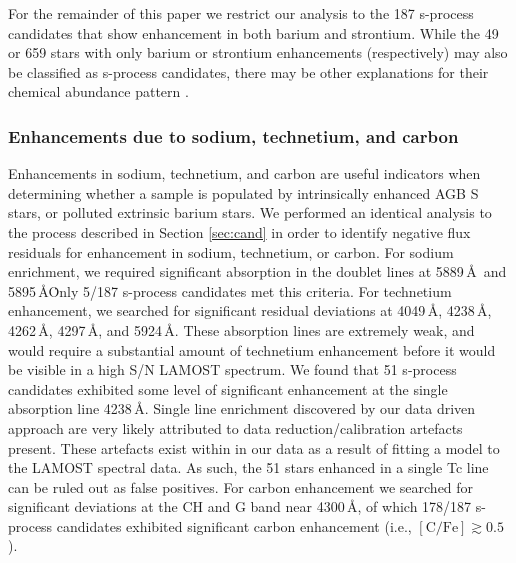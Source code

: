 \documentclass[a4paper,fleqn,usenatbib]{mnras}
\begin{document}
For the remainder of this paper we restrict our analysis to the 187 s-process candidates that show enhancement in both barium and strontium. While the 49 or 659 stars with only barium or strontium enhancements (respectively) may also be classified as s-process candidates, there may be other explanations for their chemical abundance pattern \citep[e.g.,][]{maiorca2011}. 


\subsubsection{Enhancements due to sodium, technetium, and carbon} \label{sec:other enhancements}
Enhancements in sodium, technetium, and carbon are useful indicators when determining whether a sample is populated by intrinsically enhanced AGB S stars, or polluted extrinsic barium stars. We performed an identical analysis to the process described in Section \ref{sec:cand} in order to identify negative flux residuals for enhancement in sodium, technetium, or carbon. For sodium enrichment, we required significant absorption in the doublet lines at 5889\,\AA\ and 5895\,\AA\. Only 5/187 s-process candidates met this criteria. For technetium enhancement, we searched for significant residual deviations at 4049\,\AA, 4238\,\AA, 4262\,\AA, 4297\,\AA, and 5924\,\AA. These absorption lines are extremely weak, and would require a substantial amount of technetium enhancement before it would be visible in a high S/N LAMOST spectrum. We found that 51 s-process candidates exhibited some level of significant enhancement at the single absorption line 4238\,\AA. Single line enrichment discovered by our data driven approach are very likely attributed to data reduction/calibration artefacts present. These artefacts exist within in our data as a result of fitting a model to the LAMOST spectral data. As such, the 51 stars enhanced in a single Tc line can be ruled out as false positives. For carbon enhancement we searched for significant deviations at the CH and G band near 4300\,\AA, of which 178/187 s-process candidates exhibited significant carbon enhancement (i.e., $[\textrm{C/Fe}] \gtrsim 0.5$). 
\end{document}
